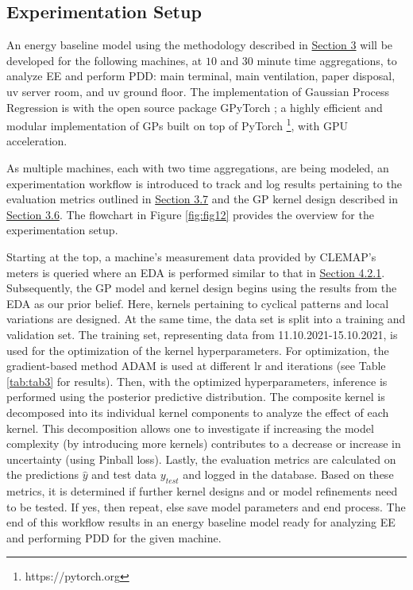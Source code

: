 \subsection{Experimentation Setup}

An energy baseline model using the methodology described in \hyperlink{section.3}{Section 3} will be developed for the following machines, at $10$ and $30$ minute time aggregations, to analyze EE and perform PDD: main terminal, main ventilation, paper disposal, uv server room, and uv ground floor. The implementation of Gaussian Process Regression is with the open source package GPyTorch \cite{gardner2018gpytorch}; a highly efficient and modular implementation of GPs built on top of PyTorch \footnote[2]{https://pytorch.org}, with \ac{GPU} acceleration. 

As multiple machines, each with two time aggregations, are being modeled, an experimentation workflow is introduced to track and log results pertaining to the evaluation metrics outlined in \hyperlink{subsection.3.7}{Section 3.7} and the GP kernel design described in \hyperlink{subsection.3.6}{Section 3.6}. The flowchart in Figure \ref{fig:fig12} provides the overview for the experimentation setup. 

Starting at the top, a machine's measurement data provided by CLEMAP's meters is queried where an EDA is performed similar to that in \hyperlink{subsubsection.4.2.1}{Section 4.2.1}. Subsequently, the GP model and kernel design begins using the results from the EDA as our prior belief. Here, kernels pertaining to cyclical patterns and local variations are designed. At the same time, the data set is split into a training and validation set. The training set, representing data from 11.10.2021-15.10.2021, is used for the optimization of the kernel hyperparameters. For optimization, the gradient-based method \ac{ADAM} \cite{pml1Book} is used at different \ac{lr} and iterations (see Table \ref{tab:tab3} for results). Then, with the optimized hyperparameters, inference is performed using the posterior predictive distribution. The composite kernel is decomposed into its individual kernel components to analyze the effect of each kernel. This decomposition allows one to investigate if increasing the model complexity (by introducing more kernels) contributes to a decrease or increase in uncertainty (using Pinball loss). Lastly, the evaluation metrics are calculated on the predictions $\hat{y}$ and test data $y_{test}$ and logged in the database. Based on these metrics, it is determined if further kernel designs and or model refinements need to be tested. If yes, then repeat, else save model parameters and end process. The end of this workflow results in an energy baseline model ready for analyzing EE and performing PDD for the given machine.   

